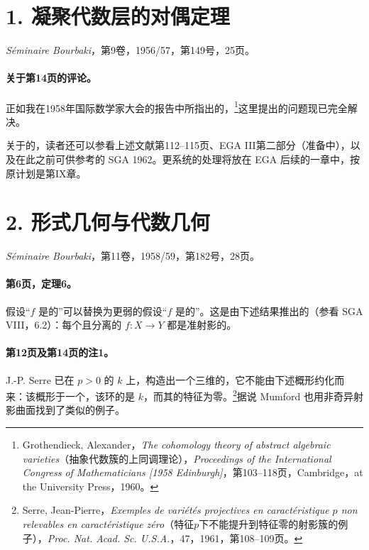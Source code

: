 \section*{1. 凝聚代数层的对偶定理}
\noindent\textit{Séminaire Bourbaki}，第9卷，1956/57，第149号，25页。

\paragraph{关于第14页的评论。}正如我在1958年国际数学家大会的报告中所指出的，\footnote{Grothendieck, Alexander，\textit{The cohomology theory of abstract algebraic varieties}（抽象代数簇的上同调理论），\textit{Proceedings of the International Congress of Mathematicians [1958 Edinburgh]}，第103--118页，Cambridge，at the University Press，1960。}这里提出的问题现已完全解决。

关于的，读者还可以参看上述文献第112--115页、EGA III第二部分（准备中），以及在此之前可供参考的 SGA 1962。更系统的处理将放在 EGA 后续的一章中，按原计划是第IX章。

\section*{2. 形式几何与代数几何}
\noindent\textit{Séminaire Bourbaki}，第11卷，1958/59，第182号，28页。

\paragraph{第6页，定理6。}假设“$f$ 是的”可以替换为更弱的假设“$f$ 是的”。这是由下述结果推出的（参看 SGA VIII，6.2）：每个且分离的 $f\colon X\to Y$ 都是准射影的。

\paragraph{第12页及第14页的注1。}J.-P. Serre 已在 $p>0$ 的 $k$ 上，构造出一个三维的，它不能由下述概形约化而来：该概形于一个，该环的是 $k$，而其的特征为零。\footnote{Serre, Jean-Pierre，\textit{Exemples de variétés projectives en caractéristique $p$ non relevables en caractéristique zéro}（特征$p$下不能提升到特征零的射影簇的例子），\textit{Proc. Nat. Acad. Sc. U.S.A.}，47，1961，第108--109页。}据说 Mumford 也用非奇异射影曲面找到了类似的例子。


